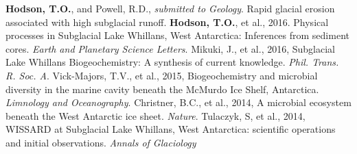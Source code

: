 \renewcommand{\refname}{Publications}
\begin{thebibliography}{1}
\bibitem{}\textbf{Hodson, T.O.}, and Powell, R.D., \textsl{submitted to Geology}. Rapid glacial erosion associated with high subglacial runoff.
\bibitem{}\textbf{Hodson, T.O.}, et al., 2016. Physical processes in Subglacial Lake Whillans, West Antarctica: Inferences from sediment cores.
\textsl{Earth and Planetary Science Letters}.
\bibitem{}Mikuki, J., et al., 2016, Subglacial Lake Whillans Biogeochemistry: A synthesis of current knowledge. \textsl{Phil. Trans. R. Soc. A}.
\bibitem{}Vick-Majors, T.V., et al., 2015, Biogeochemistry and microbial diversity in the marine cavity beneath the McMurdo Ice Shelf, Antarctica.
\textsl{Limnology and Oceanography}.
\bibitem{}Christner, B.C., et al., 2014, A microbial ecosystem beneath the West Antarctic ice sheet. \textsl{Nature}.
\bibitem{}Tulaczyk, S, et al., 2014, WISSARD at Subglacial Lake Whillans, West Antarctica: scientific operations and initial observations. \textsl{Annals of Glaciology}
\end{thebibliography}


